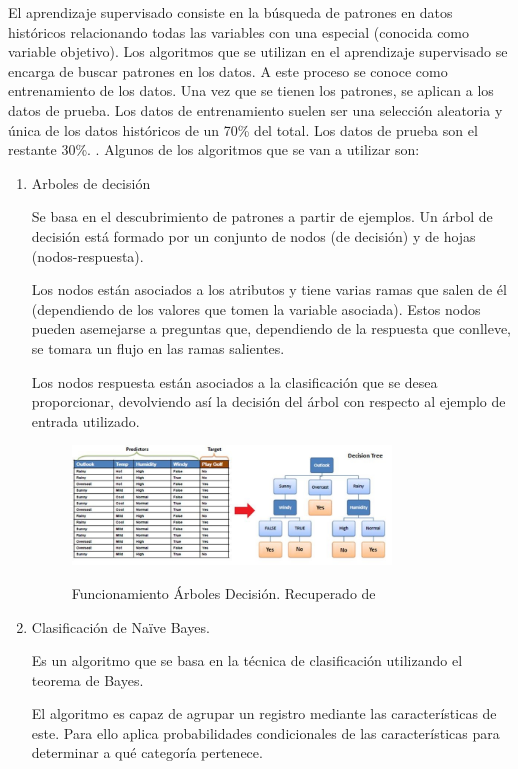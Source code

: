 El aprendizaje supervisado consiste en la búsqueda de patrones en datos históricos relacionando todas las variables con una especial (conocida como variable objetivo). Los algoritmos que se utilizan en el aprendizaje supervisado se encarga de buscar patrones en los datos. A este proceso se conoce como entrenamiento de los datos. Una vez que se tienen los patrones, se aplican a los datos de prueba. Los datos de entrenamiento suelen ser una selección aleatoria y única de los datos históricos de un 70\% del total. Los datos de prueba son el restante 30\%. \cite{Manguart2017}.
Algunos de los algoritmos que se van a utilizar son:
\begin{enumerate}
	\item Arboles de decisión
	
	Se basa en el descubrimiento de patrones a partir de ejemplos. Un árbol de decisión está formado por un conjunto de nodos (de decisión) y de hojas (nodos-respuesta).
	
	Los nodos están asociados a los atributos y tiene varias ramas que salen de él (dependiendo de los valores que tomen la variable asociada). Estos nodos pueden asemejarse a preguntas que, dependiendo de la respuesta que conlleve, se tomara un flujo en las ramas salientes.
	
	Los nodos respuesta están asociados a la clasificación que se desea proporcionar, devolviendo así la decisión del árbol con respecto al ejemplo de entrada utilizado.
	
	\begin{figure}[htb]
		\centering
		\caption{Funcionamiento Árboles Decisión. Recuperado de \protect{}}
		\includegraphics[width=0.8\textwidth]{recursos/arbol_decision_img1}
		\label{fig:fun_arb_dec}
	\end{figure}
	\FloatBarrier
	
	
	\item Clasificación de Naïve Bayes.
	
	Es un algoritmo que se basa en la técnica de clasificación utilizando el teorema de Bayes.
	
	El algoritmo es capaz de agrupar un registro mediante las características de este. Para ello aplica probabilidades condicionales de las características para determinar a qué categoría pertenece. 
	

\end{enumerate}
